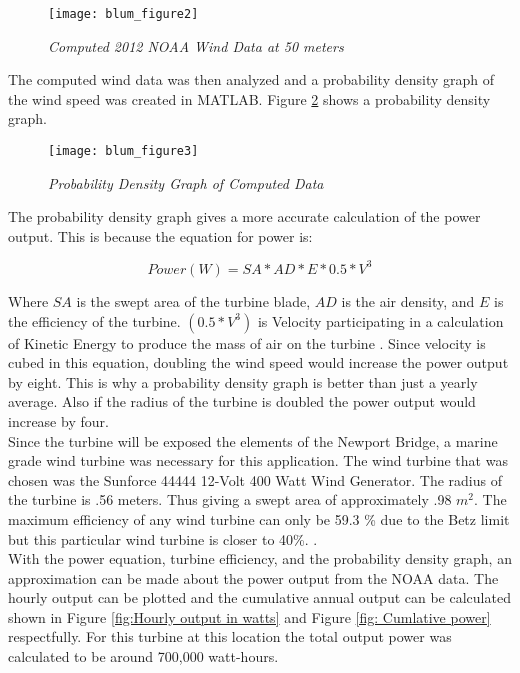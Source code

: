 \begin{figure}
\centering
\texttt{[image: blum\_figure2]}
\caption{\textit{Computed 2012 NOAA Wind Data at 50 meters}}
\label{fig:new_computed_wind_data}
\end{figure}


The computed wind data was then analyzed and a probability density graph of the wind speed was created in MATLAB. Figure \ref{fig:Probality_density_function} shows a probability density graph.



\begin{figure}
\centering
\texttt{[image: blum\_figure3]}
\caption{\textit{Probability Density Graph of Computed Data}}
\label{fig:Probality_density_function}
\end{figure}

The probability density graph gives a more accurate calculation of the power output. This is because the equation for power is: 

\begin{equation}
Power(W)={SA}*{AD}*{E}*{0.5}*{V^3}
\end{equation}

Where $SA$ is the swept area of the turbine blade, $AD$ is the air density, and $E$ is the efficiency of the turbine. $(0.5 * V^3)$ is Velocity participating in a calculation of Kinetic Energy to produce the mass of air on the turbine \cite{ArcGIS2012}. Since velocity is cubed in this equation, doubling the wind speed would increase the power output by eight. This is why a probability density graph is better than just a yearly average.  Also if the radius of the turbine is doubled the power output would increase by four.\\
\indent
Since the turbine will be exposed the elements of the Newport Bridge, a marine grade wind turbine was necessary for this application. The wind turbine that was chosen was the Sunforce 44444 12-Volt 400 Watt Wind Generator. The radius of the turbine is .56 meters. Thus giving a swept area of approximately .98 $m^2$. The maximum efficiency of any wind turbine can only be 59.3 \% due to the Betz limit but this particular wind turbine is closer to 40\%. \cite{Windpower2008}.\\
\indent   
With the power equation, turbine efficiency, and the probability density graph, an approximation can be made about the power output from the NOAA data. The hourly output can be plotted and the cumulative annual output can be calculated shown in Figure \ref{fig:Hourly output in watts} and Figure \ref{fig: Cumlative power} respectfully. For this turbine at this location the total output power was calculated to be around 700,000 watt-hours. \\
\indent

